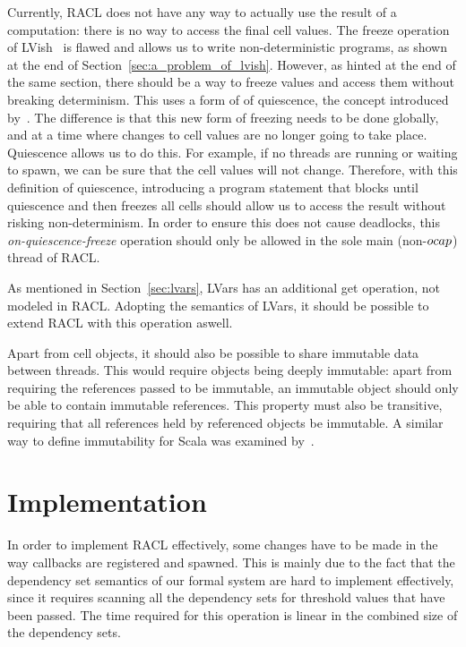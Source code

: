Currently, RACL does not have any way to actually use the result of a
computation: there is no way to access the final cell values. The
freeze operation of LVish~\parencite{kuper2014freeze} is flawed and allows us to
write non-deterministic programs, as shown at the end of
Section~\ref{sec:a_problem_of_lvish}. However, as hinted at the end of the same
section, there should be a way to freeze values and access them without breaking
determinism.  This uses a form of of quiescence, the concept introduced
by~\textcite{kuper2014freeze}. The difference is that this new form of freezing
needs to be done globally, and at a time where changes to cell values are no
longer going to take place. Quiescence allows us to do this. For example, if no
threads are running or waiting to spawn, we can be sure that the cell values
will not change. Therefore, with this definition of quiescence, introducing a
program statement that blocks until quiescence and then freezes all cells
should allow us to access the result without risking non-determinism. In order
to ensure this does not cause deadlocks, this \emph{on-quiescence-freeze}
operation should only be allowed in the sole main (non-$\mbox{$ocap$}$) thread of RACL.

As mentioned in Section~\ref{sec:lvars}, LVars has an additional get
operation, not modeled in RACL. Adopting the semantics of LVars, it should be
possible to extend RACL with this operation aswell.

Apart from cell objects, it should also be possible to share immutable data
between threads. This would require objects being deeply immutable: apart from
requiring the references passed to be immutable, an immutable object should only be able
to contain immutable references. This property must also be transitive,
requiring that all references held by referenced objects be immutable. A similar way
to define immutability for Scala was examined by~\textcite{HallerA17}.

\section{Implementation}%
\label{sec:implementation}

In order to implement RACL effectively, some changes have to be made in the way
callbacks are registered and spawned. This is mainly due to the fact that the dependency
set semantics of our formal system are hard to implement effectively, since it
requires scanning all the dependency sets for threshold values that have been
passed. The time required for this operation is linear in the combined size of
the dependency sets.  

